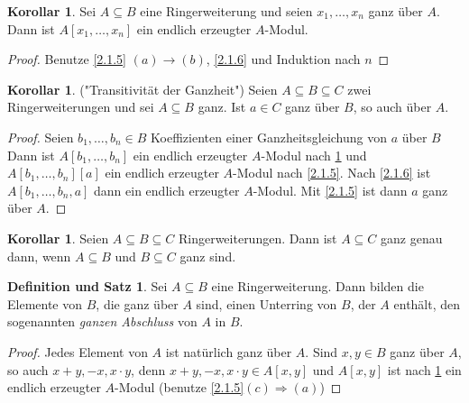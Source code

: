 \documentclass[
twoside=semi,
fontsize=12,
DIV=12, 
cleardoublepage=current,
leqno,
headings=optiontoheadandtoc, 
toc=idx
]{scrbook}
\theoremstyle{definition}
\newtheorem{korollar}[definition]{Korollar}
\newtheorem{def-satz}[definition]{Definition und Satz}
\begin{document}
	\begin{korollar}\label{2.1.7}
		Sei $A \subseteq B$ eine Ringerweiterung und seien $x_1, \dots, x_n$ ganz \"uber $A$. Dann ist $A[x_1, \dots, x_n]$ ein endlich erzeugter $A$-Modul.
		
		\begin{proof}
			Benutze \ref{2.1.5} $(a) \rightarrow (b)$, \ref{2.1.6} und Induktion nach $n$
		\end{proof}
	\end{korollar}

	\begin{korollar}\label{2.1.8}
		("Transitivit\"at der Ganzheit")\newline
		Seien $A \subseteq B \subseteq C$ zwei Ringerweiterungen und sei $A \subseteq B$ ganz. Ist $a \in C$ ganz \"uber $B$, so auch \"uber $A$.
		
		\begin{proof}
			Seien $b_1, \dots, b_n \in B$ Koeffizienten einer Ganzheitsgleichung von $a$ \"uber $B$ Dann ist $A[b_1, \dots, b_n]$ ein endlich erzeugter $A$-Modul nach \ref{2.1.7} und $A[b_1, \dots, b_n][a]$ ein endlich erzeugter $A$-Modul nach \ref{2.1.5}. Nach \ref{2.1.6} ist $A[b_1, \dots, b_n, a]$ dann ein endlich erzeugter $A$-Modul. Mit \ref{2.1.5} ist dann $a$ ganz \"uber $A$.
		\end{proof}
	\end{korollar}
	
	\begin{korollar}\label{2.1.9}
		Seien $A \subseteq B \subseteq C$ Ringerweiterungen. Dann ist $A \subseteq C$ ganz genau dann, wenn $A \subseteq B$ und $B \subseteq C$ ganz sind.
	
	\end{korollar}
	
	
	\begin{def-satz}\label{2.1.10}
		Sei $A \subseteq B$ eine Ringerweiterung. Dann bilden die Elemente von $B$, die ganz \"uber $A$ sind, einen Unterring von $B$, der $A$ enth\"alt, den sogenannten \emph{ganzen Abschluss} von $A$ in $B$.
		
		
		\begin{proof}
			Jedes Element von $A$ ist nat\"urlich ganz \"uber $A$. Sind $x,y \in B$ ganz \"uber $A$, so auch $x+y, -x, x\cdot y$, denn $x+y,-x,x\cdot y\in A[x,y]$ und $A[x,y]$ ist nach \ref{2.1.7} ein endlich erzeugter $A$-Modul (benutze \ref{2.1.5}$(c)\Rightarrow(a)$) 
		\end{proof} 
 	\end{def-satz}
 
\end{document}
